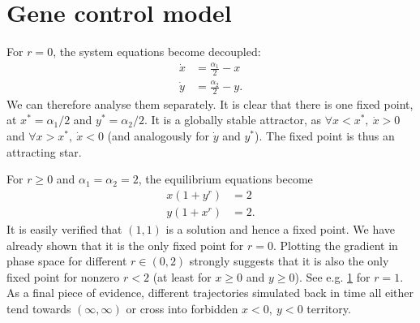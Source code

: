 \section{Gene control model}

For $r = 0$, the system equations become decoupled:
%
\begin{align*}
\dot{x} &= \frac{\alpha_1}{2} - x  \\
\dot{y} &= \frac{\alpha_2}{2} - y.
\end{align*}
%
We can therefore analyse them separately. It is clear that there is one fixed point, at $x^* = \alpha_1/2$ and $y^* = \alpha_2/2$. It is a globally stable attractor, as $\forall x < x^*,\ \dot{x} > 0$ and $\forall x > x^*,\ \dot{x} < 0$ (and analogously for $\dot{y}$ and $y^*$). The fixed point is thus an attracting star.

For $r \geq 0$ and $\alpha_1 = \alpha_2 = 2$, the equilibrium equations become
%
\begin{align*}
x (1+y^r) &= 2 \\
y (1+x^r) &= 2.
\end{align*}
%
It is easily verified that $(1,1)$ is a solution and hence a fixed point. We have already shown that it is the only fixed point for $r = 0$. Plotting the gradient in phase space for different $r \in (0, 2)$ strongly suggests that it is also the only fixed point for nonzero $r < 2$ (at least for $x \geq 0$ and $y \geq 0$). See e.g. \cref{fig:genes_r1} for $r = 1$. As a final piece of evidence, different trajectories simulated back in time all either tend towards $(\infty, \infty)$ or cross into forbidden $x < 0,\ y < 0$ territory.

\begin{figure}
\label{fig:genes_r1}
\end{figure}


